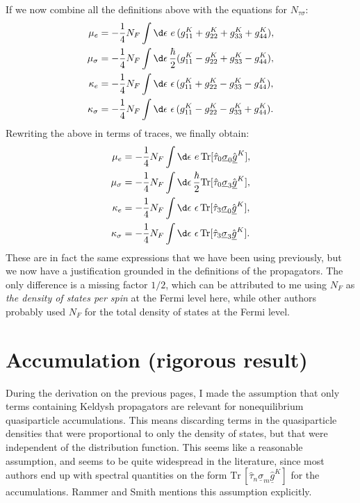 If we now combine all the definitions above with the equations for $N_{\tau\sigma}$:
\begin{align}
  \mu_e        &= -\frac{1}{4} N_F \int \d\epsilon \, \,e\,           (g^K_{11} + g^K_{22} + g^K_{33} + g^K_{44}), \\
  \mu_\sigma   &= -\frac{1}{4} N_F \int \d\epsilon \, \frac{\hbar}{2} (g^K_{11} - g^K_{22} + g^K_{33} - g^K_{44}), \\
  \kappa_e      &= -\frac{1}{4} N_F \int \d\epsilon \, \,\epsilon\,    (g^K_{11} + g^K_{22} - g^K_{33} - g^K_{44}), \\
  \kappa_\sigma &= -\frac{1}{4} N_F \int \d\epsilon \, \,\epsilon\,    (g^K_{11} - g^K_{22} - g^K_{33} + g^K_{44}).
\end{align}
Rewriting the above in terms of traces, we finally obtain:
\begin{align}
  \mu_e        &= -\frac{1}{4} N_F \int \d\epsilon \,  \,e\,           \text{Tr}[\hat{\tau}_0 \underline{\sigma}_0 \hat{\underline{g}}^K], \\
  \mu_\sigma   &= -\frac{1}{4} N_F \int \d\epsilon \,  \frac{\hbar}{2} \text{Tr}[\hat{\tau}_0 \underline{\sigma}_3 \hat{\underline{g}}^K], \\
  \kappa_e      &= -\frac{1}{4} N_F \int \d\epsilon \,  \,\epsilon\,    \text{Tr}[\hat{\tau}_3 \underline{\sigma}_0 \hat{\underline{g}}^K], \\
  \kappa_\sigma &= -\frac{1}{4} N_F \int \d\epsilon \,  \,\epsilon\,    \text{Tr}[\hat{\tau}_3 \underline{\sigma}_3 \hat{\underline{g}}^K].
\end{align}
These are in fact the same expressions that we have been using previously, but we now have a justification grounded in the definitions of the propagators.
The only difference is a missing factor $1/2$, which can be attributed to me using $N_F$ as \emph{the density of states per spin} at the Fermi level here, while other authors probably used $N_F$ for the total density of states at the Fermi level.

\clearpage
\section{Accumulation (rigorous result)}
During the derivation on the previous pages, I made the assumption that only terms containing Keldysh propagators are relevant for nonequilibrium quasiparticle accumulations.
This means discarding terms in the quasiparticle densities that were proportional to only the density of states, but that were independent of the distribution function.
This seems like a reasonable assumption, and seems to be quite widespread in the literature, since most authors end up with spectral quantities on the form $\text{Tr}\,[\hat{\tau}_n \underline{\sigma}_m \underline{\hat{g}}^K]$ for the accumulations.
Rammer and Smith mentions this assumption explicitly.


